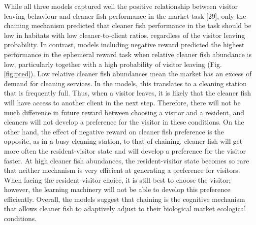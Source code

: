 \documentclass[10pt,letterpaper]{article}
\begin{document}
While all three models captured well the positive relationship between
visitor leaving behaviour and cleaner fish performance in the market
task {[}29{]}, only the chaining mechanism predicted that cleaner fish
performance in the task should be low in habitats with low
cleaner-to-client ratios, regardless of the visitor leaving probability.
In contrast, models including negative reward predicted the highest
performance in the ephemeral reward task when relative cleaner fish
abundance is low, particularly together with a high probability of
visitor leaving (Fig. \ref{fig:pred}). Low relative cleaner fish
abundances mean the market has an excess of demand for cleaning
services. In the models, this translates to a cleaning station that is
frequently full. Thus, when a visitor leaves, it is likely that the
cleaner fish will have access to another client in the next step.
Therefore, there will not be much difference in future reward between
choosing a visitor and a resident, and cleaners will not develop a
preference for the visitor in these conditions. On the other hand, the
effect of negative reward on cleaner fish preference is the opposite, as
in a busy cleaning station, to that of chaining. cleaner fish will get
more often the resident-visitor state and will develop a preference for
the visitor faster. At high cleaner fish abundances, the
resident-visitor state becomes so rare that neither mechanism is very
efficient at generating a preference for visitors. When facing the
resident-visitor choice, it is still best to choose the visitor;
however, the learning machinery will not be able to develop this
preference efficiently. Overall, the models suggest that chaining is the
cognitive mechanism that allows cleaner fish to adaptively adjust to
their biological market ecological conditions.
\end{document}
